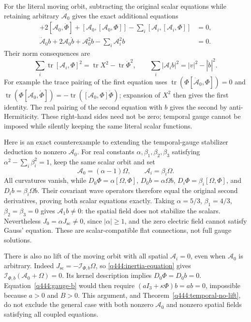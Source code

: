 For the literal moving orbit, subtracting the original scalar equations
while retaining arbitrary $\mathcal A_0$ gives the exact additional
equations
\begin{align*}
 [\dot{\mathcal A}_0,\Phi]+2[\mathcal A_0,\dot\Phi]
 +[\mathcal A_0,[\mathcal A_0,\Phi]]
 -\sum_i[\mathcal A_i,[\mathcal A_i,\Phi]]&=0,\\
 \dot{\mathcal A}_0b+2\mathcal A_0\dot b+\mathcal A_0^2b
                   -\sum_i\mathcal A_i^2b&=0.
\end{align*}
Their norm consequences are
\[
 \sum_i\operatorname{tr}[\mathcal A_i,\Phi]^2
       =\operatorname{tr}X^2-\operatorname{tr}\dot\Phi^2,\qquad
 \sum_i|\mathcal A_i b|^2=|v|^2-|\dot b|^2.
\]
For example the trace pairing of the first equation uses
$\operatorname{tr}(\Phi[\dot{\mathcal A}_0,\Phi])=0$ and
$\operatorname{tr}(\Phi[\mathcal A_0,\dot\Phi])
=-\operatorname{tr}([\mathcal A_0,\Phi]\dot\Phi)$; expansion of $X^2$
then gives the first identity. The real pairing of the second equation
with $b$ gives the second by anti-Hermiticity. These right-hand sides
need not be zero; temporal gauge cannot be imposed while silently keeping
the same literal scalar functions.

Here is an exact counterexample to extending the temporal-gauge
stabilizer deduction to nonzero $\mathcal A_0$. For real constants
$\alpha,\beta_1,\beta_2,\beta_3$ satisfying
$\alpha^2-\sum_i\beta_i^2=1$, keep the same scalar orbit and set
\[
 \mathcal A_0=(\alpha-1)\Omega,\qquad
 \mathcal A_i=\beta_i\Omega.
\]
All curvatures vanish, while
$D_0\Phi=\alpha[\Omega,\Phi]$, $D_0b=\alpha\Omega b$,
$D_i\Phi=\beta_i[\Omega,\Phi]$, and $D_i b=\beta_i\Omega b$.
Their covariant wave operators therefore equal the original second
derivatives, proving both scalar equations exactly. Taking
$\alpha=5/3$, $\beta_1=4/3$, $\beta_2=\beta_3=0$ gives
$\mathcal A_1b\neq0$: the spatial field does not stabilize the scalars.
Nevertheless $J_0=\alpha J_{\mathrm{sc}}\neq0$, since $|\alpha|\ge1$,
and the zero electric field cannot satisfy Gauss' equation. These are
scalar-compatible flat connections, not full gauge solutions.

There is also no lift of the moving orbit with all spatial
$\mathcal A_i=0$, even when $\mathcal A_0$ is arbitrary.
Indeed $J_{\mathrm{sc}}=-\mathscr I_{\Phi,b}\Omega$, so
\eqref{q444:inertia-equation} gives
$\mathscr I_{\Phi,b}(\mathcal A_0+\Omega)=0$.
Its kernel description implies $D_0\Phi=D_0b=0$.
Equation~\eqref{q444:gauge-b} would then require
$(aI_3+\kappa\Phi)b=ab=0$, impossible because $a>0$ and $B>0$.
This argument, and Theorem~\ref{q444:temporal-no-lift}, do not exclude
the general case with both nonzero $\mathcal A_0$ and nonzero spatial
fields satisfying all coupled equations.

